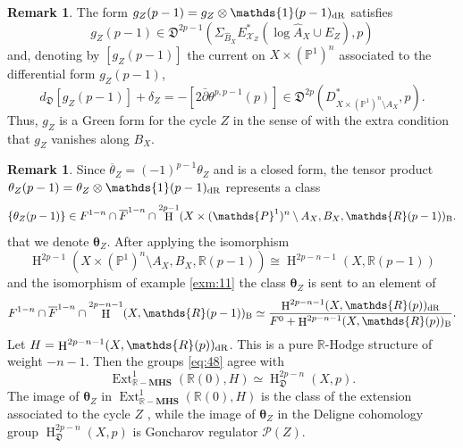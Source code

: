 \documentclass[11pt,a4paper]{amsart}
\newcommand{\Betti}{\text{\rm B}}
\newcommand{\dR}{\text{\rm dR}}
\renewcommand{\P}{\mathds{P}}
\newcommand{\R}{\mathds{R}}
\newcommand{\caP}{\mathcal{P}}
\newcommand{\caX}{\mathcal{X}}
\newcommand{\fD}{\mathfrak{D}}
\newcommand{\bfone}{{\mathds{1}}}
\DeclareMathOperator{\Ext}{Ext}
\DeclareMathOperator{\rH}{H}
\newcommand{\RMHS}{\R-\mathbf{MHS}}
\numberwithin{equation}{section}
\theoremstyle{plain}
\theoremstyle{definition}
\newtheorem{rmk}[prop]{Remark}
\begin{document}
\begin{rmk}\label{rem:13} The form $g_{Z}(p-1)=g_Z\otimes \bfone(p-1)_{\dR}$
  satisfies 
  \begin{displaymath}
    g_Z(p-1)\in
    \fD^{2p-1}( \Sigma
  _{\widehat{B}_X}E^{\ast}_{\caX_{Z}}(\log \widehat{A}_{X}\cup E_{Z}),p)
\end{displaymath}
and, denoting by $[g_Z(p-1)]$ the current on $X\times (\P^{1})^{n}$
associated to the differential form $g_{Z}(p-1)$,
\begin{displaymath}
  d_{\fD}[g_Z(p-1)]+\delta _Z=
  -[2\bar \partial \theta ^{p,p-1}(p)]
  \in 
    \fD^{2p}( D^{\ast}_{X\times (\P^1)^n\setminus A_{X}},p).
\end{displaymath}
Thus, $g_Z$ is a Green form for the cycle $Z$  in the sense of
\cite{Burgos:CDB} with the extra condition that $g_{Z}$ vanishes along $B_X$.
\end{rmk}
\begin{rmk}
  Since $\overline \theta_{Z} =(-1)^{p-1}\theta_{Z} $ and is a closed form,
  the tensor product $\theta _{Z}(p-1)=\theta_{Z} \otimes \bfone(p-1)_{\dR}$ represents a
  class
  \begin{displaymath}
    \{\theta_{Z} (p-1)\}\in
    F^{1-n}\cap \overline F^{1-n}\cap\rH^{2p-1}(X\times
    (\P^{1})^{n}\setminus A_{X},B_{X},\R(p-1))_{\Betti}.
  \end{displaymath}
  that we denote $\boldsymbol{\theta }_{Z}$. 
  After applying the isomorphism 
  \begin{displaymath}
    \rH^{2p-1}(X\times
    (\P^{1})^{n}\setminus A_{X},B_{X},\R(p-1))\cong
    \rH^{2p-n-1}(X,\R(p-1))
  \end{displaymath}
  and the isomorphism of example \ref{exm:11}
  the class $\boldsymbol{\theta }_{Z}$ is sent to an element of
  \begin{equation}\label{eq:48}
    F^{1-n}\cap \overline
    F^{1-n}\cap\rH^{2p-n-1}(X,\R(p-1))_{\Betti}\simeq
    \frac{\rH^{2p-n-1}(X,\R(p))_{\dR}}{F^{0}+\rH^{2p-n-1}(X,\R(p))_{\Betti}}.
  \end{equation}
  Let $H=\rH^{2p-n-1}(X,\R(p))_{\dR}$. This is a pure $\R$-Hodge
  structure of weight $-n-1$. Then the groups \eqref{eq:48} agree with
  \begin{displaymath}
    \Ext^{1}_{\RMHS}(\R(0),H)\simeq \rH^{2p-n}_{\fD}(X,p).
  \end{displaymath}
  The image of $\boldsymbol{\theta }_{Z}$ in
  $\Ext^{1}_{\RMHS}(\R(0),H)$ is the class of the extension
  associated to the cycle $Z$ \cite[Prop. 3.6]{BGGP:Height}, while the
  image of $\boldsymbol{\theta }_{Z}$ in the Deligne cohomology group
  $\rH^{2p-n}_{\fD}(X,p)$ is Goncharov regulator $\caP(Z)$.
\end{rmk}
\end{document}
